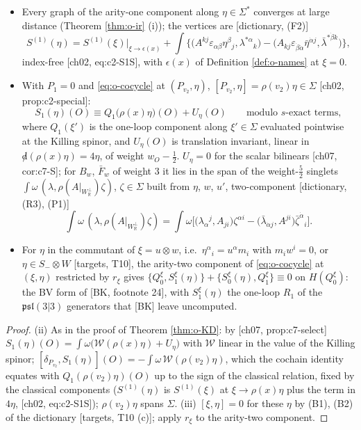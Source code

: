 \begin{proposition}
\label{prop:o-S}
\begin{itemize}
\item[(i)] Every graph of the arity-one component along $\eta\in\Sigma^*$ converges at large distance (Theorem \ref{thm:o-ir} (i)); the vertices are [dictionary, (F2)]
\[
S^{(1)}(\eta)=S^{(1)}(\xi)\big|_{\xi\to\epsilon(x)}+\int\Big\{\big(A^{kj}\varepsilon_{\alpha\beta}\eta^\beta{}_j,\lambda^{*\alpha}{}_k\big)-\big(A_{kj}\varepsilon_{\dot\beta\dot\alpha}\bar\eta^{\dot\alpha j},\bar\lambda^{*\dot\beta k}\big)\Big\},
\]
index-free [ch02, eq:c2-S1S], with $\epsilon(x)$ of Definition \ref{def:o-names} at $\xi=0$.
\item[(ii)] With $P_1=0$ and \eqref{eq:o-cocycle} at $(P_{v_2},\eta)$, $[P_{v_2},\eta]=\rho(v_2)\eta\in\Sigma$ [ch02, prop:c2-special]:
\begin{equation}
S_1(\eta)(O)\equiv Q_1\big(\rho(x)\eta\big)(O)+U_\eta(O)\qquad\text{modulo }s\text{-exact terms},
\label{eq:o-SQ}
\end{equation}
where $Q_1(\xi')$ is the one-loop component along $\xi'\in\Sigma$ evaluated pointwise at the Killing spinor, and $U_\eta(O)$ is translation invariant, linear in ${\not d}(\rho(x)\eta)=4\eta$, of weight $w_O-\tfrac12$. $U_\eta=0$ for the scalar bilinears [ch07, cor:c7-S]; for $B_w$, $\bar F_w$ of weight $3$ it lies in the span of the weight-$\tfrac52$ singlets $\int\omega\,(\lambda,\rho(A|_{W_{\mathbb R}^\perp})\zeta)$, $\zeta\in\Sigma$ built from $\eta$, $w$, $u'$, two-component [dictionary, (R3), (P1)]
\[
\int\omega\,(\lambda,\rho(A|_{W_{\mathbb R}^\perp})\zeta)=\int\omega\Big[\big(\lambda_\alpha{}^j,A_{ji}\big)\zeta^{\alpha i}-\big(\bar\lambda_{\dot\alpha j},A^{ji}\big)\bar\zeta^{\dot\alpha}{}_i\Big].
\]
\item[(iii)] For $\eta$ in the commutant of $\xi=u\otimes w$, i.e.\ $\eta^\alpha{}_i=u^\alpha m_i$ with $m_iw^i=0$, or $\eta\in S_-\otimes W$ [targets, T10], the arity-two component of \eqref{eq:o-cocycle} at $(\xi,\eta)$ restricted by $r_\xi$ gives $\{Q_0^\xi,S_1^\xi(\eta)\}+\{S_0^\xi(\eta),Q_1^\xi\}\equiv0$ on $H(Q_0^\xi)$: the BV form of [BK, footnote 24], with $S_1^\xi(\eta)$ the one-loop $R_1$ of the $\mathfrak{psl}(3|3)$ generators that [BK] leave uncomputed.
\end{itemize}
\end{proposition}

\begin{proof}
(ii) As in the proof of Theorem \ref{thm:o-KD}: by [ch07, prop:c7-select] $S_1(\eta)(O)=\int\omega\big(\mathcal W(\rho(x)\eta)+U_\eta\big)$ with $\mathcal W$ linear in the value of the Killing spinor; $[\delta_{P_{v_2}},S_1(\eta)](O)=-\int\omega\,\mathcal W(\rho(v_2)\eta)$, which the cochain identity equates with $Q_1(\rho(v_2)\eta)(O)$ up to the sign of the classical relation, fixed by the classical components ($S^{(1)}(\eta)$ is $S^{(1)}(\xi)$ at $\xi\to\rho(x)\eta$ plus the term in $4\eta$, [ch02, eq:c2-S1S]); $\rho(v_2)\eta$ spans $\Sigma$. (iii) $[\xi,\eta]=0$ for these $\eta$ by (B1), (B2) of the dictionary [targets, T10 (c)]; apply $r_\xi$ to the arity-two component.
\end{proof}

